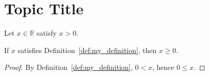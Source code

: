 \chapter{Topic Title}

\begin{definition}\label{def:my_definition}
\leanok
Let $x \in \mathbb{R}$ satisfy $x > 0$.
\end{definition}

\begin{theorem}\label{thm:my_theorem}
\leanok
If $x$ satisfies Definition~\ref{def:my_definition}, then $x \ge 0$.
\end{theorem}

\begin{proof}
\leanok
By Definition~\ref{def:my_definition}, $0 < x$, hence $0 \le x$.
\end{proof}
